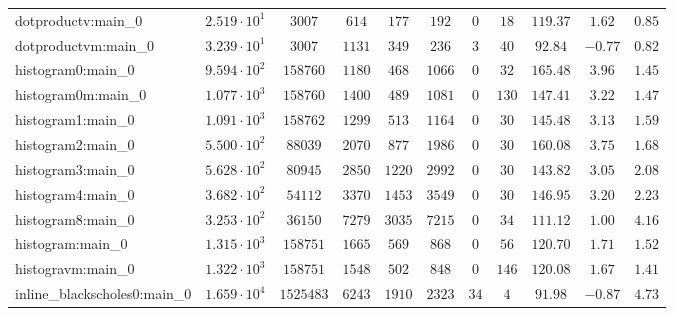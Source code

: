 \begin{tabular}{|l|c|c|c|c|c|c|c|c|c|c|}
dotproductv:main\_0            & $ 2.519 \cdot 10^{1} $ & $ 3007     $ & $ 614    $ & $ 177    $ & $ 192    $ & $ 0    $ & $ 18   $ & $ 119.37      $ & $ 1.62    $ & $ 0.85    $ \\
dotproductvm:main\_0           & $ 3.239 \cdot 10^{1} $ & $ 3007     $ & $ 1131   $ & $ 349    $ & $ 236    $ & $ 3    $ & $ 40   $ & $ 92.84       $ & $ -0.77   $ & $ 0.82    $ \\
histogram0:main\_0             & $ 9.594 \cdot 10^{2} $ & $ 158760   $ & $ 1180   $ & $ 468    $ & $ 1066   $ & $ 0    $ & $ 32   $ & $ 165.48      $ & $ 3.96    $ & $ 1.45    $ \\
histogram0m:main\_0            & $ 1.077 \cdot 10^{3} $ & $ 158760   $ & $ 1400   $ & $ 489    $ & $ 1081   $ & $ 0    $ & $ 130  $ & $ 147.41      $ & $ 3.22    $ & $ 1.47    $ \\
histogram1:main\_0             & $ 1.091 \cdot 10^{3} $ & $ 158762   $ & $ 1299   $ & $ 513    $ & $ 1164   $ & $ 0    $ & $ 30   $ & $ 145.48      $ & $ 3.13    $ & $ 1.59    $ \\
histogram2:main\_0             & $ 5.500 \cdot 10^{2} $ & $ 88039    $ & $ 2070   $ & $ 877    $ & $ 1986   $ & $ 0    $ & $ 30   $ & $ 160.08      $ & $ 3.75    $ & $ 1.68    $ \\
histogram3:main\_0             & $ 5.628 \cdot 10^{2} $ & $ 80945    $ & $ 2850   $ & $ 1220   $ & $ 2992   $ & $ 0    $ & $ 30   $ & $ 143.82      $ & $ 3.05    $ & $ 2.08    $ \\
histogram4:main\_0             & $ 3.682 \cdot 10^{2} $ & $ 54112    $ & $ 3370   $ & $ 1453   $ & $ 3549   $ & $ 0    $ & $ 30   $ & $ 146.95      $ & $ 3.20    $ & $ 2.23    $ \\
histogram8:main\_0             & $ 3.253 \cdot 10^{2} $ & $ 36150    $ & $ 7279   $ & $ 3035   $ & $ 7215   $ & $ 0    $ & $ 34   $ & $ 111.12      $ & $ 1.00    $ & $ 4.16    $ \\
histogram:main\_0              & $ 1.315 \cdot 10^{3} $ & $ 158751   $ & $ 1665   $ & $ 569    $ & $ 868    $ & $ 0    $ & $ 56   $ & $ 120.70      $ & $ 1.71    $ & $ 1.52    $ \\
histogravm:main\_0             & $ 1.322 \cdot 10^{3} $ & $ 158751   $ & $ 1548   $ & $ 502    $ & $ 848    $ & $ 0    $ & $ 146  $ & $ 120.08      $ & $ 1.67    $ & $ 1.41    $ \\
inline\_blackscholes0:main\_0  & $ 1.659 \cdot 10^{4} $ & $ 1525483  $ & $ 6243   $ & $ 1910   $ & $ 2323   $ & $ 34   $ & $ 4    $ & $ 91.98       $ & $ -0.87   $ & $ 4.73    $ \\

\end{tabular}
